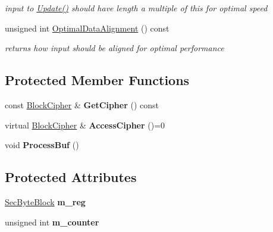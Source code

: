 \begin{DoxyCompactItemize}
\begin{DoxyCompactList}\small\item\em input to \hyperlink{class_c_m_a_c___base_a582cd6d32b41c65d10481ebcd2c1aed4}{Update()} should have length a multiple of this for optimal speed \item\end{DoxyCompactList}\item 
\hypertarget{class_c_m_a_c___base_a02457ae06393f0707c2f24d22a79fdc1}{
unsigned int \hyperlink{class_c_m_a_c___base_a02457ae06393f0707c2f24d22a79fdc1}{OptimalDataAlignment} () const }
\label{class_c_m_a_c___base_a02457ae06393f0707c2f24d22a79fdc1}

\begin{DoxyCompactList}\small\item\em returns how input should be aligned for optimal performance \item\end{DoxyCompactList}\end{DoxyCompactItemize}
\subsection*{Protected Member Functions}
\begin{DoxyCompactItemize}
\item 
\hypertarget{class_c_m_a_c___base_aecdc09d5bac3bbe15c8033232766d1cc}{
const \hyperlink{class_block_cipher}{BlockCipher} \& {\bfseries GetCipher} () const }
\label{class_c_m_a_c___base_aecdc09d5bac3bbe15c8033232766d1cc}

\item 
\hypertarget{class_c_m_a_c___base_a36ad9773edfe6a2f16351189a2dd7c29}{
virtual \hyperlink{class_block_cipher}{BlockCipher} \& {\bfseries AccessCipher} ()=0}
\label{class_c_m_a_c___base_a36ad9773edfe6a2f16351189a2dd7c29}

\item 
\hypertarget{class_c_m_a_c___base_ac2afd1c354b701bc99e348506f4ff022}{
void {\bfseries ProcessBuf} ()}
\label{class_c_m_a_c___base_ac2afd1c354b701bc99e348506f4ff022}

\end{DoxyCompactItemize}
\subsection*{Protected Attributes}
\begin{DoxyCompactItemize}
\item 
\hypertarget{class_c_m_a_c___base_a4d86570d8c11a683fa9cde782f731832}{
\hyperlink{class_sec_block}{SecByteBlock} {\bfseries m\_\-reg}}
\label{class_c_m_a_c___base_a4d86570d8c11a683fa9cde782f731832}

\item 
\hypertarget{class_c_m_a_c___base_ac5e4896b4851323b817b253b015f7307}{
unsigned int {\bfseries m\_\-counter}}
\label{class_c_m_a_c___base_ac5e4896b4851323b817b253b015f7307}

\end{DoxyCompactItemize}
